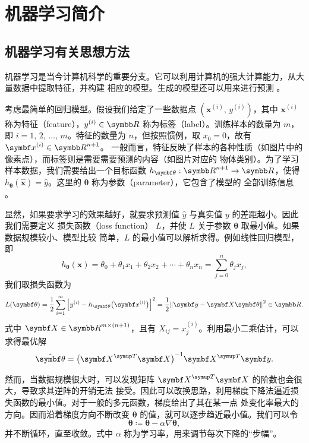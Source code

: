 \chapter{机器学习简介}

\section{机器学习有关思想方法}

机器学习是当今计算机科学的重要分支。它可以利用计算机的强大计算能力，从大量数据中提取特征，并构建
相应的模型。生成的模型还可以用来进行预测 \cite{zhouzhihua,wiki:ml}。

考虑最简单的回归模型。假设我们给定了一些数据点 $(\bm{x}^{(i)}, \, y^{(i)})$，其中 $\bm{x}^{(i)}$
称为特征（feature），$y^{(i)}\in\R$ 称为标签（label）。训练样本的数量为 $m$，即
$i=1,\,2,\,\ldots,\,m$。特征的数量为 $n$，但按照惯例，取 $x_0=0$，故有 $\bm{x}^{(i)}\in\R^{n+1}$。
一般而言，特征反映了样本的各种性质（如图片中的像素点），而标签则是需要需要预测的内容（如图片对应的
物体类别）。为了学习样本数据，我们需要给出一个目标函数 $h_\bm{\theta}: \R^{n+1}\to\R$，使得
$h_\bm{\theta}(\hat{\bm{x}})=\hat{y}$。这里的 $\bm{\theta}$ 称为参数（parameter），它包含了模型的
全部训练信息 \cite{zhouzhihua,tensorflow}。

显然，如果要求学习的效果越好，就要求预测值 $\hat{y}$ 与真实值 $y$ 的差距越小。因此我们需要定义
损失函数（loss function） $L$，并使 $L$ 关于参数 $\bm{\theta}$ 取最小值。如果数据规模较小、模型比较
简单，$L$ 的最小值可以解析求得。例如线性回归模型，即
\begin{equation}
  h_\bm{\theta} (\bm{x})
  = \theta_0 + \theta_1 x_1 + \theta_2 x_2 + \cdots + \theta_n x_n
  = \sum_{j=0}^n \theta_j x_j,
\end{equation}
我们取损失函数为
\begin{equation}
  \label{eq:loss-function-linear}
  L(\bm{\theta})
  = \frac{1}{2} \sum_{i=1}^m \qty\Big[y^{(i)} - h_\bm{\theta}\qty\big(\bm{x}^{(i)})]^2
  = \frac{1}{2} \norm{\bm{y} - \bm{X}\bm{\theta}}^2 \in \R.
\end{equation}
式中 $\bm{X}\in\R^{m\times(n+1)}$，且有 $X_{ij} = x^{(i)}_j$。利用最小二乘估计，可以求得最优解
\cite{zhouzhihua}
\begin{equation}
  \hat{\bm{\theta}} = \qty\big(\bm{X}^\trans\bm{X})^{-1} \bm{X}^\trans \bm{y}.
\end{equation}

然而，当数据规模很大时，可以发现矩阵 $\bm{X}^\trans\bm{X}$ 的阶数也会很大，导致求其逆阵的开销无法
接受。因此可以改换思路，利用梯度下降法逼近损失函数的最小值。对于一般的多元函数，梯度给出了其在某一点
处变化率最大的方向。因而沿着梯度方向不断改变 $\bm{\theta}$ 的值，就可以逐步趋近最小值。我们可以令
\begin{equation}
  \bm{\theta} \coloneq \bm{\theta} - \alpha\nabla\bm{\theta},
\end{equation}
并不断循环，直至收敛。式中 $\alpha$ 称为学习率，用来调节每次下降的“步幅”。

